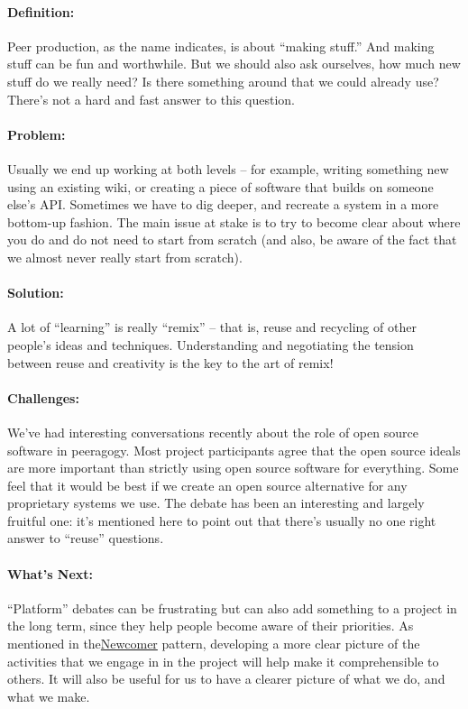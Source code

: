 \paragraph{Definition:} Peer production, as the name indicates, is about
``making stuff.'' And making stuff can be fun and worthwhile. But we
should also ask ourselves, how much new stuff do we really need? Is
there something around that we could already use? There's not a hard and
fast answer to this question.

\paragraph{Problem:} Usually we end up working at both levels -- for
example, writing something new using an existing wiki, or creating a
piece of software that builds on someone else's API. Sometimes we have
to dig deeper, and recreate a system in a more bottom-up fashion. The
main issue at stake is to try to become clear about where you do and do
not need to start from scratch (and also, be aware of the fact that we
almost never really start from scratch).

\paragraph{Solution:} A lot of ``learning'' is really ``remix'' -- that is,
reuse and recycling of other people's ideas and techniques.
Understanding and negotiating the tension between reuse and creativity
is the key to the art of remix!

\paragraph{Challenges:} We've had interesting conversations recently about
the role of open source software in peeragogy. Most project participants
agree that the open source ideals are more important than strictly using
open source software for everything. Some feel that it would be best if
we create an open source alternative for any proprietary systems we use.
The debate has been an interesting and largely fruitful one: it's
mentioned here to point out that there's usually no one right answer to
``reuse'' questions.

\paragraph{What's Next:} ``Platform'' debates can be frustrating but can
also add something to a project in the long term, since they help people
become aware of their priorities. As mentioned in
the\href{http://peeragogy.org/patterns/newcomer/}{Newcomer} pattern,
developing a more clear picture of the activities that we engage in in
the project will help make it comprehensible to others. It will also be
useful for us to have a clearer picture of what we do, and what we make.

